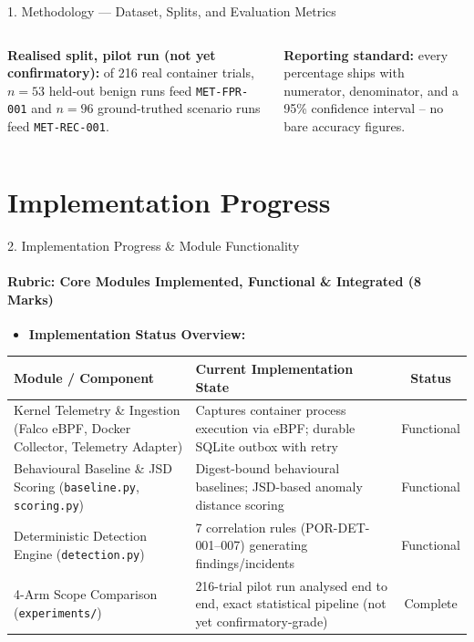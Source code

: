 \documentclass[aspectratio=169, 11pt]{beamer}
\begin{document}
\begin{frame}{1. Methodology --- Dataset, Splits, and Evaluation Metrics}
\begin{columns}[T,onlytextwidth]
\smallskip
\textbf{Realised split, pilot run (not yet confirmatory):} of 216 real container trials,
$n=53$ held-out benign runs feed \texttt{MET-FPR-001} and $n=96$
ground-truthed scenario runs feed \texttt{MET-REC-001}.

\smallskip
\textcolor{amritaMaroon}{\textbf{Reporting standard:}} every percentage
ships with numerator, denominator, and a 95\% confidence interval -- no
bare accuracy figures.
\end{columns}
\end{frame}


\section{Implementation Progress}
\begin{frame}{2. Implementation Progress \& Module Functionality}
    \framesubtitle{Rubric: Core Modules Implemented, Functional \& Integrated (8 Marks)}
    \begin{itemize}
        \item \textbf{Implementation Status Overview:}
    \end{itemize}
    \begin{table}
        \centering
        \small
        \renewcommand{\arraystretch}{1.15}
        \begin{tabular}{|p{4.2cm}|p{5.8cm}|c|}
            \hline
            \textbf{Module / Component} & \textbf{Current Implementation State} & \textbf{Status} \\
            \hline
            Kernel Telemetry \& Ingestion (Falco eBPF, Docker Collector, Telemetry Adapter) & Captures container process execution via eBPF; durable SQLite outbox with retry & Functional \\
            \hline
            Behavioural Baseline \& JSD Scoring (\texttt{baseline.py}, \texttt{scoring.py}) & Digest-bound behavioural baselines; JSD-based anomaly distance scoring & Functional \\
            \hline
            Deterministic Detection Engine (\texttt{detection.py}) & 7 correlation rules (POR-DET-001--007) generating findings/incidents & Functional \\
            \hline
            4-Arm Scope Comparison (\texttt{experiments/}) & 216-trial pilot run analysed end to end, exact statistical pipeline (not yet confirmatory-grade) & Complete \\
            \hline
        \end{tabular}
    \end{table}
\end{frame}
\end{document}
